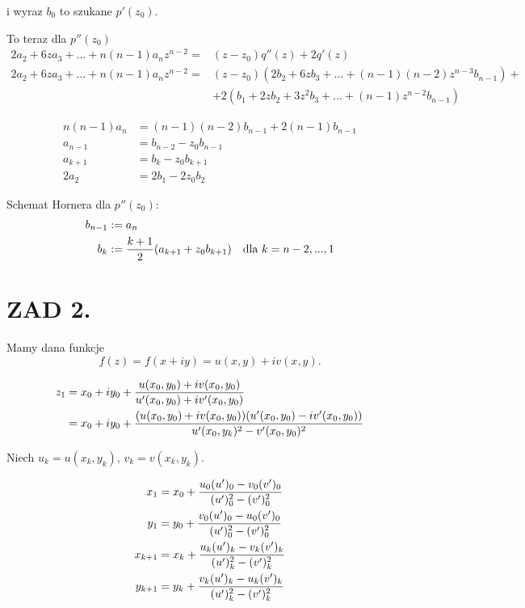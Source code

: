 \documentclass{article}[16pt]
\begin{document}
    i wyraz $b_0$ to szukane $p'(z_0)$.
    \medskip

    To teraz dla $p''(z_0)$
    \begin{align*}
        2a_2+6za_3+...+n(n-1)a_nz^{n-2}=&(z-z_0)q''(z)+2q'(z)\\
        2a_2+6za_3+...+n(n-1)a_nz^{n-2}=&(z-z_0)(2b_2+6zb_3+...+(n-1)(n-2)z^{n-3}b_{n-1})+\\
        &+2(b_1+2zb_2+3z^2b_3+...+(n-1)z^{n-2}b_{n-1})
    \end{align*}

    \begin{align*}
        n(n-1)a_n&=(n-1)(n-2)b_{n-1}+2(n-1)b_{n-1}\\
        a_{n-1}&=b_{n-2}-z_0b_{n-1}\\
        a_{k+1}&=b_{k}-z_0b_{k+1}\\
        2a_2&=2b_1-2z_0b_2
    \end{align*}

    Schemat Hornera dla $p''(z_0)$:
    \begin{align*}
        b_{n-1}&:=a_n\\
        b_k&:={k+1\over2}(a_{k+1}+z_0b_{k+1})\quad\text{dla }k=n-2,...,1
    \end{align*}


    \section*{ZAD 2.}

    Mamy dana funkcje
    $$f(z)=f(x+iy)=u(x,y)+iv(x,y).$$

    \begin{align*}
        z_1&=x_0+iy_0+{u(x_0,y_0)+iv(x_0,y_0)\over u'(x_0,y_0)+iv'(x_0,y_0)}\\
        &=x_0+iy_0+{(u(x_0,y_0)+iv(x_0,y_0))(u'(x_0,y_0)-iv'(x_0,y_0))\over u'(x_0,y_k)^2-v'(x_0,y_0)^2}
    \end{align*}
    
    Niech $u_k=u(x_k,y_k)$, $v_k=v(x_k,y_k)$.

    \begin{align*}
        x_{1}&=x_0+{u_0(u')_0-v_0(v')_0\over (u')_0^2-(v')_0^2}\\
        y_{1}&=y_0+{v_0(u')_0-u_0(v')_0\over (u')_0^2-(v')_0^2}\\
        x_{k+1}&=x_k+{u_k(u')_k-v_k(v')_k\over (u')_k^2-(v')_k^2}\\
        y_{k+1}&=y_k+{v_k(u')_k-u_k(v')_k\over (u')_k^2-(v')_k^2}
    \end{align*}
\end{document}
